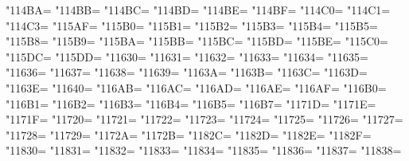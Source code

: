 \XeTeXcharclass"114BA=\KclassCM
\XeTeXcharclass"114BB=\KclassCM
\XeTeXcharclass"114BC=\KclassCM
\XeTeXcharclass"114BD=\KclassCM
\XeTeXcharclass"114BE=\KclassCM
\XeTeXcharclass"114BF=\KclassCM
\XeTeXcharclass"114C0=\KclassCM
\XeTeXcharclass"114C1=\KclassCM
\XeTeXcharclass"114C3=\KclassCM
\XeTeXcharclass"115AF=\KclassCM
\XeTeXcharclass"115B0=\KclassCM
\XeTeXcharclass"115B1=\KclassCM
\XeTeXcharclass"115B2=\KclassCM
\XeTeXcharclass"115B3=\KclassCM
\XeTeXcharclass"115B4=\KclassCM
\XeTeXcharclass"115B5=\KclassCM
\XeTeXcharclass"115B8=\KclassCM
\XeTeXcharclass"115B9=\KclassCM
\XeTeXcharclass"115BA=\KclassCM
\XeTeXcharclass"115BB=\KclassCM
\XeTeXcharclass"115BC=\KclassCM
\XeTeXcharclass"115BD=\KclassCM
\XeTeXcharclass"115BE=\KclassCM
\XeTeXcharclass"115C0=\KclassCM
\XeTeXcharclass"115DC=\KclassCM
\XeTeXcharclass"115DD=\KclassCM
\XeTeXcharclass"11630=\KclassCM
\XeTeXcharclass"11631=\KclassCM
\XeTeXcharclass"11632=\KclassCM
\XeTeXcharclass"11633=\KclassCM
\XeTeXcharclass"11634=\KclassCM
\XeTeXcharclass"11635=\KclassCM
\XeTeXcharclass"11636=\KclassCM
\XeTeXcharclass"11637=\KclassCM
\XeTeXcharclass"11638=\KclassCM
\XeTeXcharclass"11639=\KclassCM
\XeTeXcharclass"1163A=\KclassCM
\XeTeXcharclass"1163B=\KclassCM
\XeTeXcharclass"1163C=\KclassCM
\XeTeXcharclass"1163D=\KclassCM
\XeTeXcharclass"1163E=\KclassCM
\XeTeXcharclass"11640=\KclassCM
\XeTeXcharclass"116AB=\KclassCM
\XeTeXcharclass"116AC=\KclassCM
\XeTeXcharclass"116AD=\KclassCM
\XeTeXcharclass"116AE=\KclassCM
\XeTeXcharclass"116AF=\KclassCM
\XeTeXcharclass"116B0=\KclassCM
\XeTeXcharclass"116B1=\KclassCM
\XeTeXcharclass"116B2=\KclassCM
\XeTeXcharclass"116B3=\KclassCM
\XeTeXcharclass"116B4=\KclassCM
\XeTeXcharclass"116B5=\KclassCM
\XeTeXcharclass"116B7=\KclassCM
\XeTeXcharclass"1171D=\KclassCM
\XeTeXcharclass"1171E=\KclassCM
\XeTeXcharclass"1171F=\KclassCM
\XeTeXcharclass"11720=\KclassCM
\XeTeXcharclass"11721=\KclassCM
\XeTeXcharclass"11722=\KclassCM
\XeTeXcharclass"11723=\KclassCM
\XeTeXcharclass"11724=\KclassCM
\XeTeXcharclass"11725=\KclassCM
\XeTeXcharclass"11726=\KclassCM
\XeTeXcharclass"11727=\KclassCM
\XeTeXcharclass"11728=\KclassCM
\XeTeXcharclass"11729=\KclassCM
\XeTeXcharclass"1172A=\KclassCM
\XeTeXcharclass"1172B=\KclassCM
\XeTeXcharclass"1182C=\KclassCM
\XeTeXcharclass"1182D=\KclassCM
\XeTeXcharclass"1182E=\KclassCM
\XeTeXcharclass"1182F=\KclassCM
\XeTeXcharclass"11830=\KclassCM
\XeTeXcharclass"11831=\KclassCM
\XeTeXcharclass"11832=\KclassCM
\XeTeXcharclass"11833=\KclassCM
\XeTeXcharclass"11834=\KclassCM
\XeTeXcharclass"11835=\KclassCM
\XeTeXcharclass"11836=\KclassCM
\XeTeXcharclass"11837=\KclassCM
\XeTeXcharclass"11838=\KclassCM
